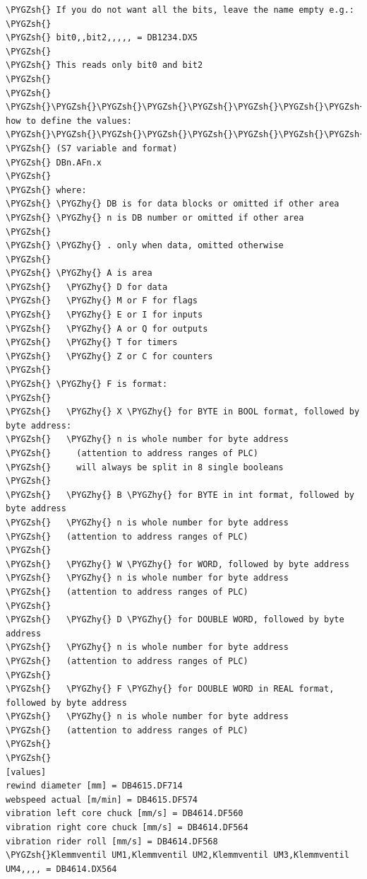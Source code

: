 \documentclass[a4paper,10pt,english]{sphinxmanual}
\def\PYGZsh{\char`\#}
\def\PYGZhy{\char`\-}
\begin{document}
\begin{Verbatim}[commandchars=\\\{\}]
\PYGZsh{} If you do not want all the bits, leave the name empty e.g.:
\PYGZsh{}
\PYGZsh{} bit0,,bit2,,,,, = DB1234.DX5
\PYGZsh{}
\PYGZsh{} This reads only bit0 and bit2
\PYGZsh{}
\PYGZsh{}
\PYGZsh{}\PYGZsh{}\PYGZsh{}\PYGZsh{}\PYGZsh{}\PYGZsh{}\PYGZsh{}\PYGZsh{}\PYGZsh{} how to define the values: \PYGZsh{}\PYGZsh{}\PYGZsh{}\PYGZsh{}\PYGZsh{}\PYGZsh{}\PYGZsh{}\PYGZsh{}\PYGZsh{}\PYGZsh{}\PYGZsh{}\PYGZsh{}\PYGZsh{}\PYGZsh{}\PYGZsh{}\PYGZsh{}\PYGZsh{}\PYGZsh{}\PYGZsh{}\PYGZsh{}\PYGZsh{}\PYGZsh{}\PYGZsh{}\PYGZsh{}\PYGZsh{}\PYGZsh{}\PYGZsh{}\PYGZsh{}\PYGZsh{}\PYGZsh{}\PYGZsh{}\PYGZsh{}\PYGZsh{}\PYGZsh{}\PYGZsh{}\PYGZsh{}\PYGZsh{}\PYGZsh{}\PYGZsh{}\PYGZsh{}\PYGZsh{}\PYGZsh{}\PYGZsh{}\PYGZsh{}
\PYGZsh{} (S7 variable and format)
\PYGZsh{} DBn.AFn.x
\PYGZsh{}
\PYGZsh{} where:
\PYGZsh{} \PYGZhy{} DB is for data blocks or omitted if other area
\PYGZsh{} \PYGZhy{} n is DB number or omitted if other area
\PYGZsh{}
\PYGZsh{} \PYGZhy{} . only when data, omitted otherwise
\PYGZsh{}
\PYGZsh{} \PYGZhy{} A is area
\PYGZsh{}   \PYGZhy{} D for data
\PYGZsh{}   \PYGZhy{} M or F for flags
\PYGZsh{}   \PYGZhy{} E or I for inputs
\PYGZsh{}   \PYGZhy{} A or Q for outputs
\PYGZsh{}   \PYGZhy{} T for timers
\PYGZsh{}   \PYGZhy{} Z or C for counters
\PYGZsh{}
\PYGZsh{} \PYGZhy{} F is format:
\PYGZsh{}
\PYGZsh{}   \PYGZhy{} X \PYGZhy{} for BYTE in BOOL format, followed by byte address:
\PYGZsh{}   \PYGZhy{} n is whole number for byte address
\PYGZsh{}     (attention to address ranges of PLC)
\PYGZsh{}     will always be split in 8 single booleans
\PYGZsh{}
\PYGZsh{}   \PYGZhy{} B \PYGZhy{} for BYTE in int format, followed by byte address
\PYGZsh{}   \PYGZhy{} n is whole number for byte address
\PYGZsh{}   (attention to address ranges of PLC)
\PYGZsh{}
\PYGZsh{}   \PYGZhy{} W \PYGZhy{} for WORD, followed by byte address
\PYGZsh{}   \PYGZhy{} n is whole number for byte address
\PYGZsh{}   (attention to address ranges of PLC)
\PYGZsh{}
\PYGZsh{}   \PYGZhy{} D \PYGZhy{} for DOUBLE WORD, followed by byte address
\PYGZsh{}   \PYGZhy{} n is whole number for byte address
\PYGZsh{}   (attention to address ranges of PLC)
\PYGZsh{}
\PYGZsh{}   \PYGZhy{} F \PYGZhy{} for DOUBLE WORD in REAL format, followed by byte address
\PYGZsh{}   \PYGZhy{} n is whole number for byte address
\PYGZsh{}   (attention to address ranges of PLC)
\PYGZsh{}
\PYGZsh{}
[values]
rewind diameter [mm] = DB4615.DF714
webspeed actual [m/min] = DB4615.DF574
vibration left core chuck [mm/s] = DB4614.DF560
vibration right core chuck [mm/s] = DB4614.DF564
vibration rider roll [mm/s] = DB4614.DF568
\PYGZsh{}Klemmventil UM1,Klemmventil UM2,Klemmventil UM3,Klemmventil UM4,,,, = DB4614.DX564
\end{Verbatim}
\end{document}

